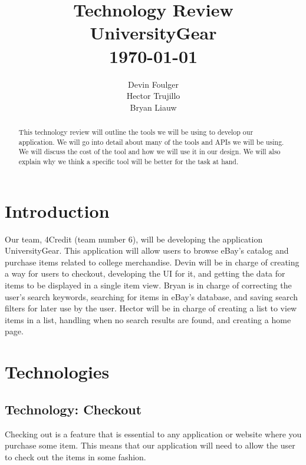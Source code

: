 \documentclass[journal,compsoc, 10pt, draftclsnofoot, onecolumn]{IEEEtran}
\begin{document}
\title{\vspace{20em}Technology Review \\{\vspace{-1ex}\huge UniversityGear} \\
{\large \today}}
\author{\vspace{10ex}Devin Foulger \\{\vspace{-1ex}Hector Trujillo}
\\{\vspace{-1ex}Bryan Liauw}}

\begin{titlepage}

\maketitle
\thispagestyle{empty}
\begin{abstract}
This technology review will outline the tools we will be using to develop our 
application. We will go into detail about many of the tools and APIs we will be 
using. We will discuss the cost of the tool and how we will use it in our design. 
We will also explain why we think a specific tool will be better for the task at
 hand.
\end{abstract}

\end{titlepage}

\tableofcontents

\section{Introduction}
Our team, 4Credit (team number 6), will be developing the application UniversityGear. 
This application will allow users to browse eBay's catalog and purchase items 
related to college merchandise. Devin will be in charge of creating a way for 
users to checkout, developing the UI for it, and getting the data for items to
be displayed in a single item view. Bryan is in charge of correcting the user's 
search keywords, searching for items in eBay's database, and saving search 
filters for later use by the user. Hector will be in charge of creating a list to 
view items in a list, handling when no search results are found, and creating
a home page.

\section{Technologies}
\subsection{Technology: Checkout}
Checking out is a feature that is essential to any application or website where
you purchase some item. This means that our application will need to allow the
user to check out the items in some fashion.
\end{document}
